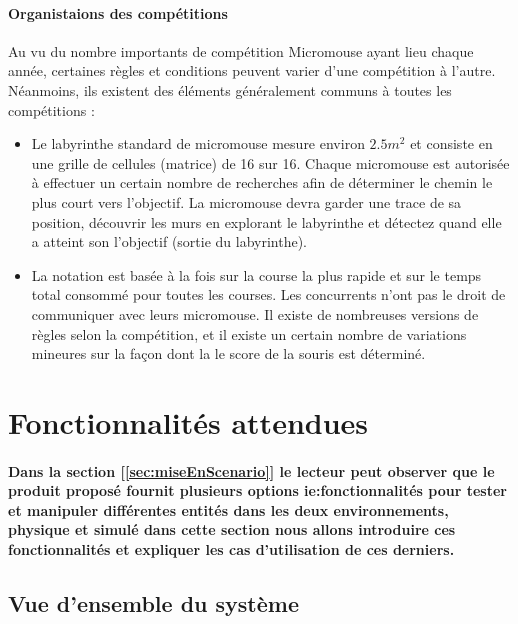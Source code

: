 \paragraph{Organistaions des compétitions}
   Au vu du nombre importants de compétition Micromouse ayant lieu chaque année,
certaines règles et conditions peuvent varier d'une compétition à l'autre.
Néanmoins, ils existent des éléments généralement communs à toutes les
compétitions : 
\\ 

\begin{itemize}

\item
   Le labyrinthe standard de micromouse mesure environ $2.5m^2$
et consiste en une grille de cellules (matrice) de 16 sur 16. Chaque micromouse
est autorisée à effectuer un certain nombre de recherches afin de déterminer le
chemin le plus court vers l'objectif.  La micromouse devra garder une trace de
sa position, découvrir les murs en explorant le labyrinthe et détectez quand
elle a atteint son l'objectif (sortie du labyrinthe). \\

\item
   La notation est basée à la fois sur la course la plus rapide et sur le temps
total consommé pour toutes les courses. Les concurrents n'ont pas le droit de
communiquer avec leurs micromouse.  Il existe de nombreuses versions de règles
selon la compétition, et il existe un certain nombre de variations mineures sur
la façon dont la le score de la souris est déterminé. \\

\end{itemize}


\clearpage
\section{Fonctionnalités attendues} \label{sec:foncAttendues}
\paragraph{
   Dans la section [\ref{sec:miseEnScenario}] le lecteur peut observer que le
produit proposé fournit plusieurs options ie:fonctionnalités pour tester et
manipuler différentes entités dans les deux environnements, physique et
simulé dans cette section nous allons introduire ces fonctionnalités et
expliquer les cas d'utilisation de ces derniers.}

\subsection{Vue d’ensemble du système} \label{sec:vueEns}

